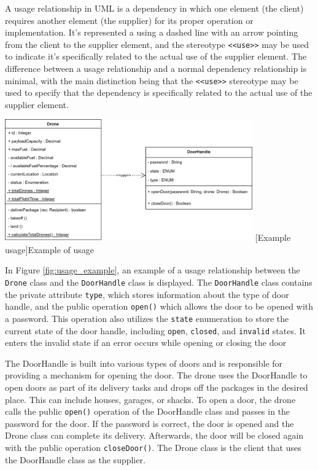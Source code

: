 \documentclass[
	12pt,
    a4paper,
    egregdoesnotlikesansseriftitles, %
    toc=chapterentrywithdots,
    oneside, openany,
    titlepage,
    parskip=half,
    headings=normal,  %
    listof=totoc,
    bibliography=totocnumbered,
    index=totoc,
    captions=tableheading,  %
    listof=flat,
    numbers=noenddot, %
    final]
    {scrbook}
\begin{document}
A usage relationship in UML is a dependency in which one element (the client) requires another element (the supplier) for its proper operation or implementation. 
It's represented a using a dashed line with an arrow pointing from the client to the supplier element, and the stereotype \texttt{<<use>>} may be used to indicate it's specifically related to the actual use of the supplier element. 
The difference between a usage relationship and a normal dependency relationship is minimal, with the main distinction being that the \texttt{<<use>>} stereotype may be used to specify that the dependency is specifically related to the actual use of the supplier element. \cite[p. 161]{uml}

\vspace{1em}
\begin{minipage}{\linewidth}
	\centering
	\includegraphics[width=0.8\textwidth]{figures/dependencies/usage.jpg}
	[Example usage]{Example of usage}
	\label{fig:usage_example}
\end{minipage}


In Figure \ref{fig:usage_example}, an example of a usage relationship between the \texttt{Drone} class and the \texttt{DoorHandle} class is displayed. The \texttt{DoorHandle} class contains the private attribute \texttt{type}, which stores information about the type of door handle, and the public operation \texttt{open()} which allows the door to be opened with a password.
This operation also utilizes the \texttt{state} enumeration to store the current state of the door handle, including \texttt{open}, \texttt{closed}, and \texttt{invalid} states.
It enters the invalid state if an error occurs while opening or closing the door

The DoorHandle is built into various types of doors and is responsible for providing a mechanism for opening the door. 
The drone uses the DoorHandle to open doors as part of its delivery tasks and drops off the packages in the desired place. 
This can include houses, garages, or shacks. 
To open a door, the drone calls the public \texttt{open()} operation of the DoorHandle class and passes in the password for the door. 
If the password is correct, the door is opened and the Drone class can complete its delivery. 
Afterwards, the door will be closed again with the public operation \texttt{closeDoor()}.
The Drone class is the client that uses the DoorHandle class as the supplier.
\end{document}
